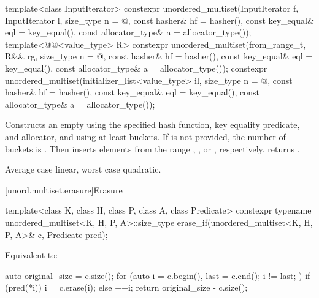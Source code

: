 %
\begin{itemdecl}
template<class InputIterator>
  constexpr unordered_multiset(InputIterator f, InputIterator l,
                               size_type n = @\seebelow@, const hasher& hf = hasher(),
                               const key_equal& eql = key_equal(),
                               const allocator_type& a = allocator_type());
template<@@<value_type> R>
  constexpr unordered_multiset(from_range_t, R&& rg,
                               size_type n = @\seebelow@, const hasher& hf = hasher(),
                               const key_equal& eql = key_equal(),
                               const allocator_type& a = allocator_type());
constexpr unordered_multiset(initializer_list<value_type> il,
                             size_type n = @\seebelow@, const hasher& hf = hasher(),
                             const key_equal& eql = key_equal(),
                             const allocator_type& a = allocator_type());
\end{itemdecl}

\begin{itemdescr}
\pnum
\effects
Constructs an empty  using the
specified hash function, key equality predicate, and allocator, and
using at least  buckets. If  is not
provided, the number of buckets is . Then
inserts elements from the range , , or ,
respectively.
 returns .

\pnum
\complexity
Average case linear, worst case quadratic.
\end{itemdescr}

[unord.multiset.erasure]{Erasure}

%
\begin{itemdecl}
template<class K, class H, class P, class A, class Predicate>
  constexpr typename unordered_multiset<K, H, P, A>::size_type
    erase_if(unordered_multiset<K, H, P, A>& c, Predicate pred);
\end{itemdecl}

\begin{itemdescr}
\pnum
\effects
Equivalent to:
\begin{codeblock}
auto original_size = c.size();
for (auto i = c.begin(), last = c.end(); i != last; ) {
  if (pred(*i)) {
    i = c.erase(i);
  } else {
    ++i;
  }
}
return original_size - c.size();
\end{codeblock}
\end{itemdescr}

